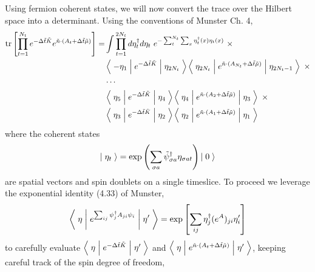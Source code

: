 Using fermion coherent states, we will now convert the trace over the Hilbert space into a determinant.
Using the conventions of Munster Ch. 4,
\begin{align}
	\text{tr}\left[\prod_{t=1}^{N_t} e^{-\Delta \tilde{t}\tilde{K}}  e^{ \tilde{n}\cdot (A_t + \Delta\tilde{t} \tilde{\mu})} \right]
	=& \int \prod_{t=1}^{2N_t} d \eta^{\dagger}_t d\eta_t ~ e^{- \sum_{t}^{N_t}\sum_x \eta^{\dagger}_t(x) \eta_t(x)}~ \times
	\nonumber\\
	&
		\left\langle\; -\eta_1 \;\middle|\; e^{-\Delta \tilde{t}\tilde{K} }\;\middle|\;\eta_{2 N_t}\;\right\rangle
		\left\langle\; \eta_{2 N_t} \;\middle|\; e^{ \tilde{n} \cdot (A_{N_t} + \Delta\tilde{t}\tilde{\mu}) } \;\middle|\;\eta_{2 N_t-1}\;\right\rangle ~ \times
	\nonumber\\
	&
		\cdots
	\nonumber\\
	&
		\left\langle\; \eta_5 \;\middle|\; e^{-\Delta \tilde{t}\tilde{K} }\;\middle|\;\eta_{4}\;\right\rangle
		\left\langle\; \eta_4 \;\middle|\; e^{ \tilde{n} \cdot (A_{2} + \Delta\tilde{t}\tilde{\mu})} \;\middle|\;\eta_3\;\right\rangle ~ \times
	\nonumber\\
	&
		\left\langle\; \eta_3 \;\middle|\; e^{-\Delta \tilde{t}\tilde{K} }\;\middle|\;\eta_{2}\;\right\rangle
		\left\langle\; \eta_2 \;\middle|\; e^{ \tilde{n} \cdot (A_{1} + \Delta\tilde{t}\tilde{\mu})} \;\middle|\;\eta_1\;\right\rangle
\end{align}
where the coherent states
\begin{equation*}
	\left|\;\eta_t\;\right\rangle = \exp\left( \sum_{\sigma a} \tilde{\psi}^{\dagger}_{\sigma a} \eta_{\sigma a t} \right) \left|\;0\;\right\rangle
\end{equation*}
are spatial vectors and spin doublets on a single timeslice.
To proceed we leverage the exponential identity (4.33) of Munster,
\begin{equation}
	\left\langle\; \eta \;\middle|\; e^{\sum_{ij} \psi^{\dagger}_j A_{ji} \psi_i} \;\middle|\; \eta' \;\right\rangle
	=
	\exp\left[ \sum_{i j} \eta^{\dagger}_j (e^A)_{ji} \eta'_i \right]
\end{equation}
to carefully evaluate $\left\langle\;\eta\;\middle|\; e^{-\Delta \tilde{t}\tilde{K}} \;\middle|\;\eta'\;\right\rangle$ and $\left\langle\;\eta\;\middle|\; e^{\tilde{n}\cdot(A_t + \Delta \tilde{t} \tilde{\mu})} \;\middle|\;\eta'\;\right\rangle$, keeping careful track of the spin degree of freedom,
